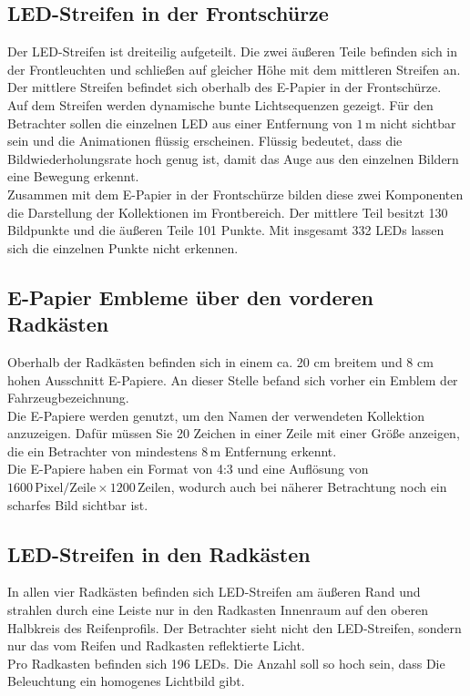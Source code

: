 \subsection{LED-Streifen in der Frontschürze}
Der LED-Streifen ist dreiteilig aufgeteilt. Die zwei äußeren Teile befinden sich in der Frontleuchten und schließen auf gleicher Höhe mit dem mittleren Streifen an. Der mittlere Streifen befindet sich oberhalb des E-Papier in der Frontschürze. \\
Auf dem Streifen werden dynamische bunte Lichtsequenzen gezeigt. Für den Betrachter sollen die einzelnen LED aus einer Entfernung von $ 1\,\mathrm{m} $ nicht sichtbar sein und die Animationen flüssig erscheinen. Flüssig bedeutet, dass die Bildwiederholungsrate hoch genug ist, damit das Auge aus den einzelnen Bildern eine Bewegung erkennt. \\
Zusammen mit dem E-Papier in der Frontschürze bilden diese zwei
Komponenten die Darstellung der Kollektionen im Frontbereich. Der mittlere Teil besitzt 130 Bildpunkte und die äußeren Teile 101 Punkte. Mit insgesamt 332 LEDs lassen sich die einzelnen Punkte nicht erkennen.
\subsection{E-Papier Embleme über den vorderen Radkästen}
Oberhalb der Radkästen befinden sich in einem ca. 20 cm breitem und 8 cm hohen Ausschnitt E-Papiere. An dieser Stelle befand sich vorher ein Emblem der Fahrzeugbezeichnung. \\
Die E-Papiere werden genutzt, um den Namen der verwendeten Kollektion anzuzeigen. Dafür müssen Sie 20 Zeichen in einer Zeile mit einer Größe anzeigen, die ein Betrachter von mindestens $ 8\,\mathrm{m} $ Entfernung erkennt. \\
Die E-Papiere haben ein Format von 4:3 und eine Auflösung von $ 1600\,\mathrm{Pixel}/\mathrm{Zeile} \times 1200\,\mathrm{Zeilen} $, wodurch auch bei näherer Betrachtung noch ein scharfes Bild sichtbar ist.
\subsection{LED-Streifen in den Radkästen}
In allen vier Radkästen befinden sich LED-Streifen am äußeren Rand und strahlen durch eine Leiste nur in den Radkasten Innenraum auf den oberen Halbkreis des Reifenprofils. Der Betrachter sieht nicht den LED-Streifen, sondern nur das vom Reifen und Radkasten reflektierte Licht. \\
Pro Radkasten befinden sich 196 LEDs. Die Anzahl soll so hoch sein, dass Die Beleuchtung ein homogenes Lichtbild gibt.
